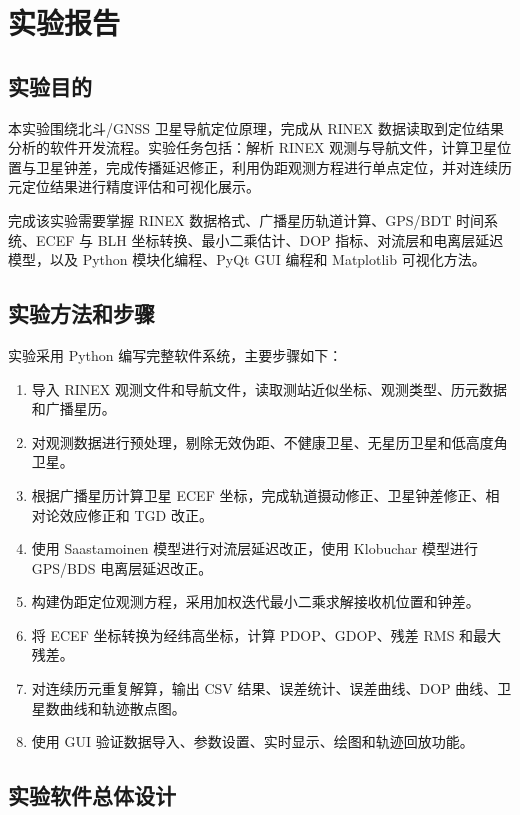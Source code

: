 \section{实验报告}

\subsection{实验目的}

本实验围绕北斗/GNSS 卫星导航定位原理，完成从 RINEX 数据读取到定位结果分析的软件开发流程。实验任务包括：解析 RINEX 观测与导航文件，计算卫星位置与卫星钟差，完成传播延迟修正，利用伪距观测方程进行单点定位，并对连续历元定位结果进行精度评估和可视化展示。

完成该实验需要掌握 RINEX 数据格式、广播星历轨道计算、GPS/BDT 时间系统、ECEF 与 BLH 坐标转换、最小二乘估计、DOP 指标、对流层和电离层延迟模型，以及 Python 模块化编程、PyQt GUI 编程和 Matplotlib 可视化方法。

\subsection{实验方法和步骤}

实验采用 Python 编写完整软件系统，主要步骤如下：

\begin{enumerate}
\item 导入 RINEX 观测文件和导航文件，读取测站近似坐标、观测类型、历元数据和广播星历。
\item 对观测数据进行预处理，剔除无效伪距、不健康卫星、无星历卫星和低高度角卫星。
\item 根据广播星历计算卫星 ECEF 坐标，完成轨道摄动修正、卫星钟差修正、相对论效应修正和 TGD 改正。
\item 使用 Saastamoinen 模型进行对流层延迟改正，使用 Klobuchar 模型进行 GPS/BDS 电离层延迟改正。
\item 构建伪距定位观测方程，采用加权迭代最小二乘求解接收机位置和钟差。
\item 将 ECEF 坐标转换为经纬高坐标，计算 PDOP、GDOP、残差 RMS 和最大残差。
\item 对连续历元重复解算，输出 CSV 结果、误差统计、误差曲线、DOP 曲线、卫星数曲线和轨迹散点图。
\item 使用 GUI 验证数据导入、参数设置、实时显示、绘图和轨迹回放功能。
\end{enumerate}

\subsection{实验软件总体设计}

